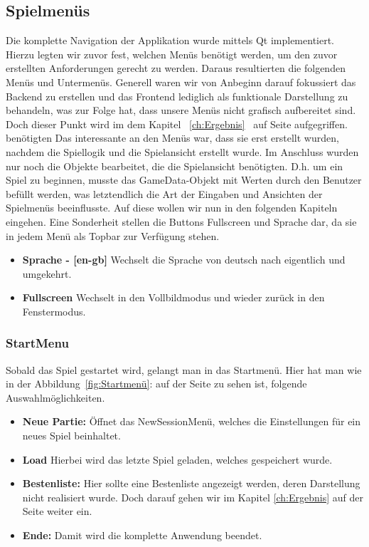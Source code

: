 \documentclass[a4paper]{scrartcl}
\begin{document}
\subsection{Spielmenüs}\label{ch:Spielmenüs}
Die komplette Navigation der Applikation wurde mittels Qt implementiert. Hierzu legten wir zuvor fest, welchen Menüs benötigt werden, um den zuvor erstellten Anforderungen gerecht zu werden. Daraus resultierten die folgenden Menüs und Untermenüs. Generell waren wir von Anbeginn darauf fokussiert das Backend zu erstellen und das Frontend lediglich als funktionale Darstellung zu behandeln, was zur Folge hat, dass unsere Menüs nicht grafisch aufbereitet sind. Doch dieser Punkt wird im dem Kapitel ~\ref{ch:Ergebnis}  \glqq{}\grqq \ auf Seite \pageref{ch:Ergebnis} aufgegriffen.
\\benötigten
Das interessante an den Menüs war, dass sie erst erstellt wurden, nachdem die Spiellogik und die Spielansicht erstellt wurde. Im Anschluss wurden nur noch die  Objekte bearbeitet, die die Spielansicht benötigten. D.h. um ein Spiel zu beginnen, musste das GameData-Objekt mit Werten durch den Benutzer befüllt werden, was letztendlich die Art der Eingaben und Ansichten der Spielmenüs beeinflusste. Auf diese wollen wir nun in den folgenden Kapiteln eingehen. Eine Sonderheit stellen die Buttons Fullscreen und Sprache dar, da sie in jedem Menü als Topbar zur Verfügung stehen.
\begin{itemize}
	\item \textbf{Sprache - [en-gb]} Wechselt die Sprache von deutsch nach eigentlich und umgekehrt.
	\item \textbf{Fullscreen} Wechselt in den Vollbildmodus und wieder zurück in den Fenstermodus.
\end{itemize}

\subsubsection{StartMenu}\label{ch:StartMenu}
Sobald das Spiel gestartet wird, gelangt man in das Startmenü. Hier hat man wie in der Abbildung~\ref{fig:Startmenü}: auf der Seite \pageref{fig:Startmenü} zu sehen ist, folgende Auswahlmöglichkeiten.

\begin{itemize}
	\item \textbf{Neue Partie: } Öffnet das NewSessionMenü, welches die Einstellungen für ein neues Spiel beinhaltet.
	\item \textbf{Load} Hierbei wird das letzte Spiel geladen, welches gespeichert wurde.
	\item \textbf{Bestenliste: } Hier sollte eine Bestenliste angezeigt werden, deren Darstellung nicht realisiert wurde. Doch darauf gehen wir im Kapitel \ref{ch:Ergebnis} auf der Seite \pageref{ch:Ergebnis} weiter ein.
	\item \textbf{Ende: } Damit wird die komplette Anwendung beendet.
\end{itemize}
\end{document}
